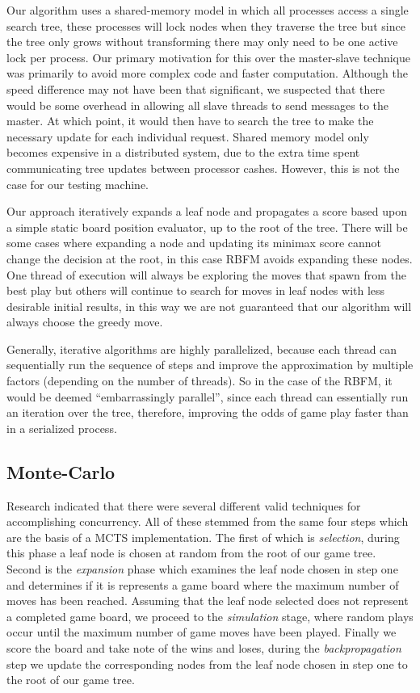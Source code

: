 \documentclass[conference]{IEEEtran}
\begin{document}
Our algorithm uses a shared-memory model in which all processes access a single search tree, these processes will lock nodes when they traverse the tree but since the tree only grows without transforming there may only need to be one active lock per process. Our primary motivation for this over the master-slave technique was primarily to avoid more complex code and faster computation. Although the speed difference may not have been that significant, we suspected that there would be some overhead in allowing all slave threads to send messages to the master. At which point, it would then have to search the tree to make the necessary update for each individual request. Shared memory model only becomes expensive in a distributed system, due to the extra time spent communicating tree updates between processor cashes. However, this is not the case for our testing machine.\par
Our approach iteratively expands a leaf node and propagates a score based upon a simple static board position evaluator, up to the root of the tree. There will be some cases where expanding a node and updating its minimax score cannot change the decision at the root, in this case RBFM avoids expanding these nodes. One thread of execution will always be exploring the moves that spawn from the best play but others will continue to search for moves in leaf nodes with less desirable initial results, in this way we are not guaranteed that our algorithm will always choose the greedy move.\par
Generally, iterative algorithms are highly parallelized, because each thread can sequentially run the sequence of steps and improve the approximation by multiple factors (depending on the number of threads). So in the case of the RBFM, it would be deemed “embarrassingly parallel”, since each thread can essentially run an iteration over the tree, therefore, improving the odds of game play faster than in a serialized process.

\subsection{Monte-Carlo}
Research indicated that there were several different valid techniques for accomplishing concurrency. All of these stemmed from the same four steps which are the basis of a MCTS implementation. The first of which is \textit{selection}, during this phase a leaf node is chosen at random from the root of our game tree. Second is the \textit{expansion} phase which examines the leaf node chosen in step one and determines if it is represents a game board where the maximum number of moves has been reached. Assuming that the leaf node selected does not represent a completed game board, we proceed to the \textit{simulation} stage, where random plays occur until the maximum number of game moves have been played. Finally we score the board and take note of the wins and loses, during the \textit{backpropagation} step we update the corresponding nodes from the leaf node chosen in step one to the root of our game tree.\par
\end{document}
